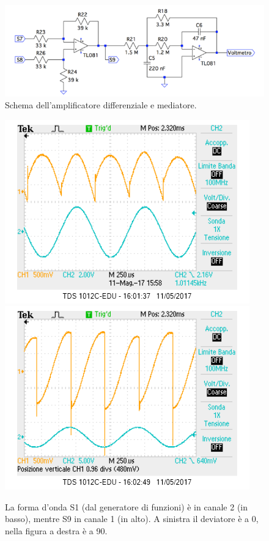 \documentclass[10pt,a4paper]{article}
\begin{document}
\begin{figure}[!htb]
  \centering
  \includegraphics[scale=0.75]{amplificatorediff-mediatore.png}
\caption{Schema dell'amplificatore differenziale e mediatore.\label{fig:amplificatorediff-mediatore}}
\end{figure}

\begin{figure}[!htb]
  \centering
  \includegraphics[scale=0.45]{dev0ch1S9-ch2S1.png}\includegraphics[scale=0.45]{dev90ch1S9-ch2S1.png}
\caption{La forma d'onda S1 (dal generatore di funzioni) è in canale 2 (in basso), mentre S9 in canale 1 (in alto). A sinistra il deviatore è a 0\degree, nella figura a destra è a 90\degree. \label{osc:devS9}}
\end{figure}
\end{document}
